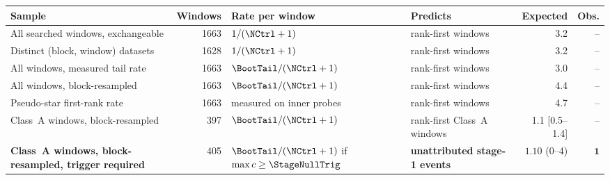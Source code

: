\begin{tabular}{@{}p{}rp{}p{}rr@{}}
\toprule
Sample & Windows & Rate per window & Predicts & Expected & Obs. \\
\midrule
All searched windows, exchangeable & 1663 & $1/(\NCtrl+1)$ & rank-first windows & 3.2 & -- \\
Distinct (block, window) datasets & 1628 & $1/(\NCtrl+1)$ & rank-first windows & 3.2 & -- \\
All windows, measured tail rate & 1663 & $\BootTail/(\NCtrl+1)$ & rank-first windows & 3.0 & -- \\
All windows, block-resampled & 1663 & $\BootTail/(\NCtrl+1)$ & rank-first windows & 4.4 & -- \\
Pseudo-star first-rank rate & 1663 & measured on inner probes & rank-first windows & 4.7 & -- \\
Class~A windows, block-resampled & 397 & $\BootTail/(\NCtrl+1)$ & rank-first Class~A windows & 1.1 [0.5--1.4] & -- \\
\textbf{Class~A windows, block-resampled, trigger required} & 405 & $\BootTail/(\NCtrl+1)$ if $\max c\geq\StageNullTrig$ & \textbf{unattributed stage-1 events} & $\mathbf{1.10}$ (0--4) & $\mathbf{1}$ \\
\bottomrule
\end{tabular}
